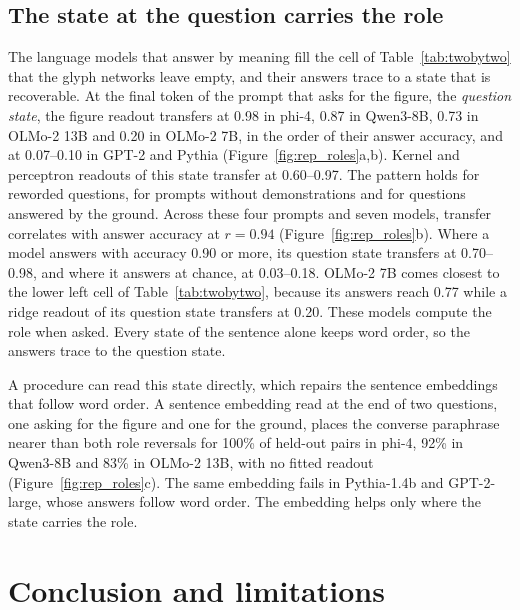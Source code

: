 \documentclass[10pt]{article}
\theoremstyle{plain}
\theoremstyle{remark}
\begin{document}
\subsection{The state at the question carries the role}
\label{sec:behavior}

The language models that answer by meaning fill the cell of Table~\ref{tab:twobytwo} that the glyph networks leave empty, and their answers trace to a state that is recoverable. At the final token of the prompt that asks for the figure, the \emph{question state}, the figure readout transfers at 0.98 in phi-4, 0.87 in Qwen3-8B, 0.73 in OLMo-2 13B and 0.20 in OLMo-2 7B, in the order of their answer accuracy, and at 0.07--0.10 in GPT-2 and Pythia (Figure~\ref{fig:rep_roles}a,b). Kernel and perceptron readouts of this state transfer at 0.60--0.97. The pattern holds for reworded questions, for prompts without demonstrations and for questions answered by the ground. Across these four prompts and seven models, transfer correlates with answer accuracy at $r = 0.94$ (Figure~\ref{fig:rep_roles}b). Where a model answers with accuracy 0.90 or more, its question state transfers at 0.70--0.98, and where it answers at chance, at 0.03--0.18. OLMo-2 7B comes closest to the lower left cell of Table~\ref{tab:twobytwo}, because its answers reach 0.77 while a ridge readout of its question state transfers at 0.20. These models compute the role when asked. Every state of the sentence alone keeps word order, so the answers trace to the question state.

A procedure can read this state directly, which repairs the sentence embeddings that follow word order. A sentence embedding read at the end of two questions, one asking for the figure and one for the ground, places the converse paraphrase nearer than both role reversals for 100\% of held-out pairs in phi-4, 92\% in Qwen3-8B and 83\% in OLMo-2 13B, with no fitted readout (Figure~\ref{fig:rep_roles}c). The same embedding fails in Pythia-1.4b and GPT-2-large, whose answers follow word order. The embedding helps only where the state carries the role.

\section{Conclusion and limitations}
\label{sec:discussion}
\end{document}
